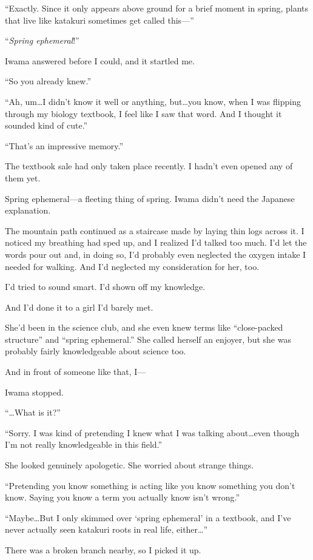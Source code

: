 \documentclass[
    a4paper,
    12pt,
    twoside,
    openany,
    UTF8,
    fontset=windows
]{ctexbook}
\begin{document}
``Exactly. Since it only appears above ground for a brief moment in spring, plants that live like katakuri sometimes get called this---''

``\textit{Spring ephemeral}!''

Iwama answered before I could, and it startled me.

``So you already knew.''

``Ah, um\dots I didn't know it well or anything, but\dots you know, when I was flipping through my biology textbook, I feel like I saw that word. And I thought it sounded kind of cute.''

``That's an impressive memory.''

The textbook sale had only taken place recently. I hadn't even opened any of them yet.

Spring ephemeral---a fleeting thing of spring. Iwama didn't need the Japanese explanation.

The mountain path continued as a staircase made by laying thin logs across it. I noticed my breathing had sped up, and I realized I'd talked too much. I'd let the words pour out and, in doing so, I'd probably even neglected the oxygen intake I needed for walking. And I'd neglected my consideration for her, too.

I'd tried to sound smart. I'd shown off my knowledge.

And I'd done it to a girl I'd barely met.

She'd been in the science club, and she even knew terms like ``close-packed structure'' and ``spring ephemeral.'' She called herself an enjoyer, but she was probably fairly knowledgeable about science too.

And in front of someone like that, I---

Iwama stopped.

``\dots What is it?''

``Sorry. I was kind of pretending I knew what I was talking about\dots even though I'm not really knowledgeable in this field.''

She looked genuinely apologetic. She worried about strange things.

``Pretending you know something is acting like you know something you don't know. Saying you know a term you actually know isn't wrong.''

``Maybe\dots But I only skimmed over `spring ephemeral' in a textbook, and I've never actually seen katakuri roots in real life, either\dots''

There was a broken branch nearby, so I picked it up.
\end{document}
